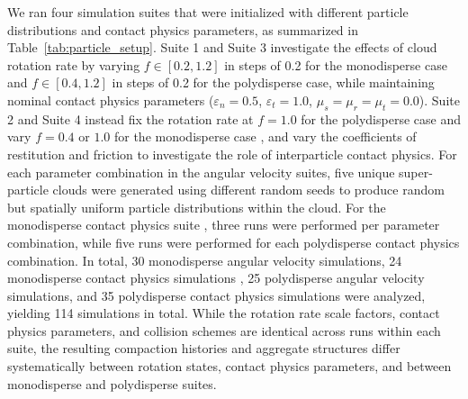 \documentclass[fleqn,usenatbib]{mnras}
\begin{document}
We ran four simulation suites that were initialized with different particle distributions and contact physics parameters, as summarized in Table~\ref{tab:particle_setup}.
Suite 1 and Suite 3 investigate the effects of cloud rotation rate by varying $f \in [0.2, 1.2]$ in steps of 0.2 for the monodisperse case \citep{Barnes2025} and $f \in [0.4, 1.2]$ in steps of 0.2 for the polydisperse case, while maintaining nominal contact physics parameters ($\varepsilon_n = 0.5$, $\varepsilon_t = 1.0$, $\mu_s = \mu_r = \mu_t = 0.0$).
Suite 2 and Suite 4 instead fix the rotation rate at $f = 1.0$ for the polydisperse case and vary $f = 0.4$ or $1.0$ for the monodisperse case \citep{Barnes2025}, and vary the coefficients of restitution and friction to investigate the role of interparticle contact physics.
For each parameter combination in the angular velocity suites, five unique super-particle clouds were generated using different random seeds to produce random but spatially uniform particle distributions within the cloud.
For the monodisperse contact physics suite \citep{Barnes2025}, three runs were performed per parameter combination, while five runs were performed for each polydisperse contact physics combination.
In total, 30 monodisperse angular velocity simulations, 24 monodisperse contact physics simulations \citep{Barnes2025}, 25 polydisperse angular velocity simulations, and 35 polydisperse contact physics simulations were analyzed, yielding 114 simulations in total.
While the rotation rate scale factors, contact physics parameters, and collision schemes are identical across runs within each suite, the resulting compaction histories and aggregate structures differ systematically between rotation states, contact physics parameters, and between monodisperse and polydisperse suites.
\end{document}
